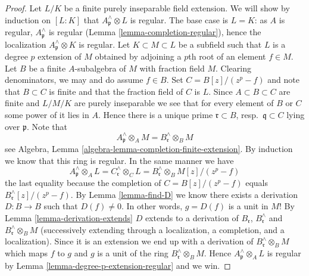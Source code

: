 \documentclass{amsart}
\theoremstyle{plain}
\theoremstyle{definition}
\theoremstyle{remark}
\numberwithin{equation}{subsection}
\begin{document}
\begin{proof}
Let $L/K$ be a finite purely inseparable field extension.
We will show by induction on $[L : K]$ that $A_\mathfrak p^\wedge \otimes L$
is regular. The base case is $L = K$: as $A$ is regular,
$A_\mathfrak p^\wedge$ is regular (Lemma \ref{lemma-completion-regular}),
hence the localization $A_\mathfrak p^\wedge \otimes K$ is regular.
Let $K \subset M \subset L$ be a subfield such that
$L$ is a degree $p$ extension of $M$ obtained by adjoining a $p$th root
of an element $f \in M$. Let $B$ be a finite $A$-subalgebra
of $M$ with fraction field $M$. Clearing denominators, we may and do assume
$f \in B$. Set $C = B[z]/(z^p -f)$ and note that $B \subset C$
is finite and that the fraction field of $C$ is $L$. Since
$A \subset B \subset C$ are finite and $L/M/K$ are purely
inseparable we see that for every element of $B$ or $C$ some power of
it lies in $A$. Hence there is a unique prime $\mathfrak r \subset B$,
resp.\ $\mathfrak q \subset C$ lying over $\mathfrak p$. Note that
$$
A_\mathfrak p^\wedge \otimes_A M = B_\mathfrak r^\wedge \otimes_B M
$$
see Algebra, Lemma \ref{algebra-lemma-completion-finite-extension}.
By induction we know that this ring is regular. In the same manner we have
$$
A_\mathfrak p^\wedge \otimes_A L =
C_\mathfrak r^\wedge \otimes_C L =
B_\mathfrak r^\wedge \otimes_B M[z]/(z^p - f)
$$
the last equality because the completion of
$C = B[z]/(z^p - f)$ equals $B_\mathfrak r^\wedge[z]/(z^p -f)$.
By Lemma \ref{lemma-find-D} we know there exists a derivation
$D : B \to B$ such that $D(f) \not = 0$. In other words, $g = D(f)$
is a unit in $M$! By Lemma \ref{lemma-derivation-extends}
$D$ extends to a derivation of $B_\mathfrak r$, $B_\mathfrak r^\wedge$
and $B_\mathfrak r^\wedge \otimes_B M$ (successively extending through a
localization, a completion, and a localization). Since it is an
extension we end up with a derivation of $B_\mathfrak r^\wedge \otimes_B M$
which maps $f$ to $g$ and $g$ is a unit of the ring
$B_\mathfrak r^\wedge \otimes_B M$.
Hence $A_\mathfrak p^\wedge \otimes_A L$ is regular by
Lemma \ref{lemma-degree-p-extension-regular} and we win.
\end{proof}
\end{document}
